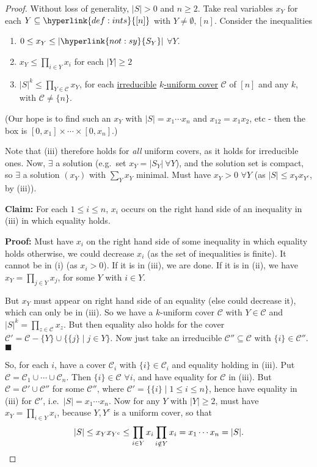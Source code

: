 \documentclass{article}
\let\subset\subseteq
\begin{document}
\begin{proof}
  Without loss of generality, $|S| > 0$ and $n \geq 2$.
  Take real variables $x_Y$ for each $Y \subseteq \hyperlink{def:ints}{[n]}$ with $Y \neq \emptyset, [n]$.
  Consider the inequalities
  \begin{enumerate}[label=(\roman*)]
    \item $ 0 \leq x_Y \leq |\hyperlink{not:sy}{S_Y}|$ $\forall Y$.
    \item $x_Y \leq \prod_{i \in Y} x_i$ for each $|Y| \geq 2$
    \item $|S|^k \leq \prod_{Y \in \mathcal{C}} x_Y$, for each \hyperlink{def:irred}{irreducible} \hyperlink{def:cover}{$k$-uniform cover} $\mathcal{C}$ of $[n]$ and any $k$, with $\mathcal{C} \neq \{n\}$.
  \end{enumerate}
  (Our hope is to find such an $x_Y$ with $|S| = x_1 \dotsm x_n$ and $x_{12} = x_1 x_2$, etc - then the box is $[0, x_1] \times \dotsm \times [0, x_n]$.)

  Note that (iii) therefore holds for \emph{all} uniform covers, as it holds for irreducible ones.
  Now, $\exists$ a solution (e.g.\ set $x_Y = |S_Y|\ \forall Y$), and the solution set is compact, so $\exists$ a solution $(x_Y)$ with $\sum_Y x_Y$ minimal.
  Must have $x_Y > 0$ $\forall Y$ (as $|S| \leq x_Y x_{Y^c}$, by (iii)).

  \textbf{Claim:} For each $1 \leq i \leq n$, $x_i$ occurs on the right hand side of an inequality in (iii) in which equality holds.

  \textbf{Proof:} Must have $x_i$ on the right hand side of some inequality in which equality holds otherwise, we could decrease $x_i$ (as the set of inequalities is finite).
  It cannot be in (i) (as $x_i > 0$).
  If it is in (iii), we are done. If it is in (ii), we have $x_Y = \prod_{j \in Y} x_j$, for some $Y$ with $i \in Y$.

  But $x_Y$ must appear on right hand side of an equality (else could decrease it), which can only be in (iii).
  So we have a $k$-uniform cover $\mathcal{C}$ with $Y \in \mathcal{C}$ and $|S|^k = \prod_{z \in \mathcal{C}} x_z$.
  But then equality also holds for the cover $\mathcal{C}' = \mathcal{C} - \{Y\} \cup \{\{j\} \mid j \in Y\}$.
  Now just take an irreducible $\mathcal{C}'' \subset \mathcal{C}$ with $\{i\} \in \mathcal{C}''$. $\blacksquare$

  So, for each $i$, have a cover $\mathcal{C}_i$ with $\{i\} \in \mathcal{C}_i$ and equality holding in (iii).
  Put $\mathcal{C} = \mathcal{C}_1 \cup \dotsb \cup \mathcal{C}_n$. Then $\{i\} \in \mathcal{C}$ $\forall i$, and have equality for $\mathcal{C}$ in (iii).
  But $\mathcal{C} = \mathcal{C}' \cup \mathcal{C}''$ for some $\mathcal{C}''$, where $\mathcal{C}' = \{\{i\} \mid 1 \leq i \leq n\}$, hence have equality in (iii) for $\mathcal{C}'$, i.e.\ $|S| = x_1 \dotsm x_n$.
  Now for any $Y$ with $|Y| \geq 2$, must have $x_Y = \prod_{i \in Y} x_i$, because $Y,Y^c$ is a uniform cover, so that
  \begin{equation*}|S| \leq x_Y x_{Y^c} \leq \prod_{i \in Y} x_i \prod_{i \notin Y} x_i = x_1 \dotsm x_n = |S|.\qedhere\end{equation*}
\end{proof}
\end{document}
